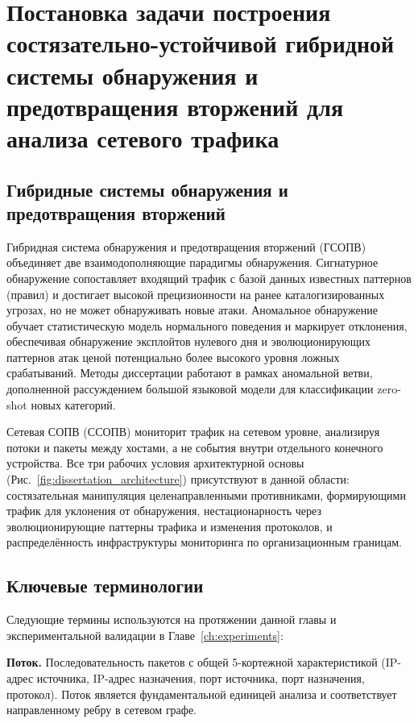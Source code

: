 \section{Постановка задачи построения состязательно-устойчивой гибридной системы обнаружения и предотвращения вторжений для анализа сетевого трафика}
\label{sec:nidps_context}

\subsection{Гибридные системы обнаружения и предотвращения вторжений}

Гибридная система обнаружения и предотвращения вторжений (ГСОПВ)~\cite{Buczak2016,Ahmad2021,Aldweesh2020,Ferrag2020,Paxson1999} объединяет две взаимодополняющие парадигмы обнаружения. Сигнатурное обнаружение сопоставляет входящий трафик с базой данных известных паттернов (правил) и достигает высокой прецизионности на ранее каталогизированных угрозах, но не может обнаруживать новые атаки. Аномальное обнаружение обучает статистическую модель нормального поведения и маркирует отклонения, обеспечивая обнаружение эксплойтов нулевого дня и эволюционирующих паттернов атак ценой потенциально более высокого уровня ложных срабатываний. Методы диссертации работают в рамках аномальной ветви, дополненной рассуждением большой языковой модели для классификации zero-shot новых категорий.

Сетевая СОПВ (ССОПВ) мониторит трафик на сетевом уровне, анализируя потоки и пакеты между хостами, а не события внутри отдельного конечного устройства. Все три рабочих условия архитектурной основы (Рис.~\ref{fig:dissertation_architecture}) присутствуют в данной области: состязательная манипуляция целенаправленными противниками, формирующими трафик для уклонения от обнаружения, нестационарность через эволюционирующие паттерны трафика и изменения протоколов, и распределённость инфраструктуры мониторинга по организационным границам.

\subsection{Ключевые терминологии}

Следующие термины используются на протяжении данной главы и экспериментальной валидации в Главе~\ref{ch:experiments}:

\noindent\textbf{Поток.} Последовательность пакетов с общей 5-кортежной характеристикой (IP-адрес источника, IP-адрес назначения, порт источника, порт назначения, протокол). Поток является фундаментальной единицей анализа и соответствует направленному ребру в сетевом графе.


